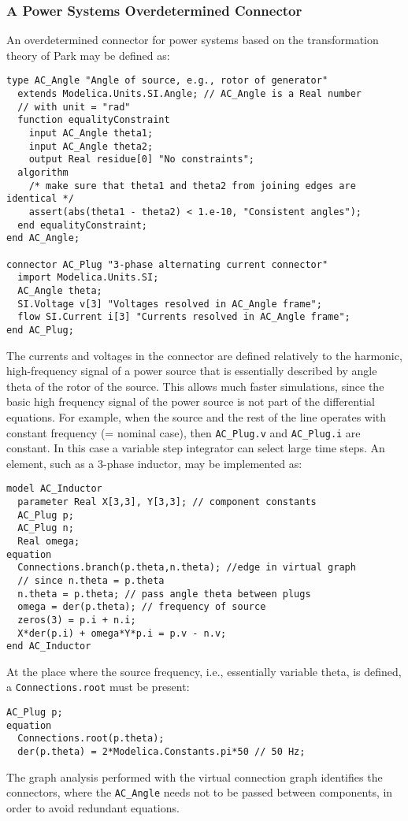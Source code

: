 \subsubsection{A Power Systems Overdetermined Connector}\label{an-overdetermined-connector-for-power-systems}\label{a-power-systems-overdetermined-connector}

\begin{nonnormative}
An overdetermined connector for power systems based on the transformation theory of Park may be defined as:
\begin{lstlisting}[language=modelica]
type AC_Angle "Angle of source, e.g., rotor of generator"
  extends Modelica.Units.SI.Angle; // AC_Angle is a Real number
  // with unit = "rad"
  function equalityConstraint
    input AC_Angle theta1;
    input AC_Angle theta2;
    output Real residue[0] "No constraints";
  algorithm
    /* make sure that theta1 and theta2 from joining edges are identical */
    assert(abs(theta1 - theta2) < 1.e-10, "Consistent angles");
  end equalityConstraint;
end AC_Angle;

connector AC_Plug "3-phase alternating current connector"
  import Modelica.Units.SI;
  AC_Angle theta;
  SI.Voltage v[3] "Voltages resolved in AC_Angle frame";
  flow SI.Current i[3] "Currents resolved in AC_Angle frame";
end AC_Plug;
\end{lstlisting}
The currents and voltages in the connector are defined relatively to the harmonic, high-frequency signal of a power source that is essentially described by angle theta of the rotor of the source.
This allows much faster simulations, since the basic high frequency signal of the power source is not part of the differential equations.
For example, when the source and the rest of the line operates with constant frequency (= nominal case), then \lstinline!AC_Plug.v! and \lstinline!AC_Plug.i! are constant.
In this case a variable step integrator can select large time steps.
An element, such as a 3-phase inductor, may be implemented as:
\begin{lstlisting}[language=modelica]
model AC_Inductor
  parameter Real X[3,3], Y[3,3]; // component constants
  AC_Plug p;
  AC_Plug n;
  Real omega;
equation
  Connections.branch(p.theta,n.theta); //edge in virtual graph
  // since n.theta = p.theta
  n.theta = p.theta; // pass angle theta between plugs
  omega = der(p.theta); // frequency of source
  zeros(3) = p.i + n.i;
  X*der(p.i) + omega*Y*p.i = p.v - n.v;
end AC_Inductor
\end{lstlisting}
At the place where the source frequency, i.e., essentially variable theta, is defined, a \lstinline!Connections.root! must be present:
\begin{lstlisting}[language=modelica]
  AC_Plug p;
equation
  Connections.root(p.theta);
  der(p.theta) = 2*Modelica.Constants.pi*50 // 50 Hz;
\end{lstlisting}
The graph analysis performed with the virtual connection graph identifies the connectors, where the \lstinline!AC_Angle! needs not to be passed between components, in order to avoid redundant equations.
\end{nonnormative}

